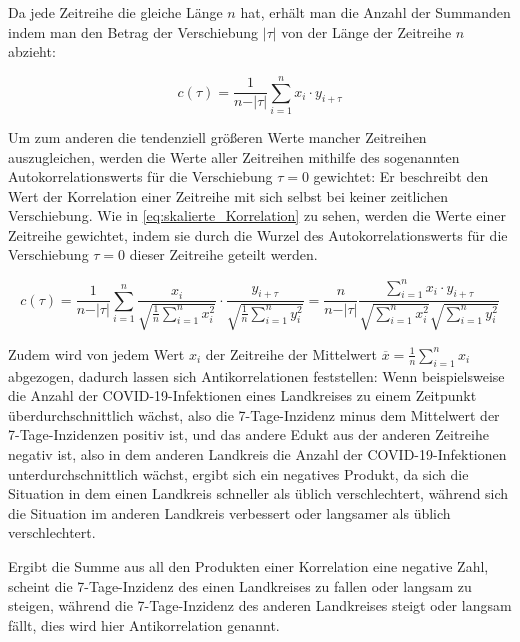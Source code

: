 Da jede Zeitreihe die gleiche Länge $n$ hat, erhält man die Anzahl der Summanden indem man
den Betrag der Verschiebung $\vert\tau\vert$
von der Länge der Zeitreihe $n$ abzieht:

\begin{equation}\label{eq:skalierte_Korrelation_geteilt_durch_Produkte}
    c(\tau) =\frac{1}{n-\vert\tau\vert} \sum_{i=1}^n x_i\cdot y_{i+\tau}
\end{equation}

Um zum anderen die tendenziell größeren Werte mancher Zeitreihen auszugleichen, werden die Werte aller Zeitreihen mithilfe des sogenannten \glqq{}Autokorrelationswerts für die Verschiebung $\tau=0$ \grqq{} gewichtet: Er beschreibt den Wert der Korrelation einer Zeitreihe mit sich selbst bei keiner zeitlichen Verschiebung. Wie in \autoref{eq:skalierte_Korrelation} zu sehen, werden die Werte einer Zeitreihe gewichtet, indem sie durch die Wurzel des Autokorrelationswerts für die Verschiebung $\tau=0$ dieser Zeitreihe geteilt werden.

\begin{equation}\label{eq:skalierte_Korrelation}
    c(\tau) =
    \frac{1}{n-\vert\tau\vert}
    \sum_{i=1}^n
    \frac{x_i}{\sqrt{\frac{1}{n}\sum_{i=1}^n x_i^2}}
    \cdot
    \frac{y_{i+\tau}}{\sqrt{\frac{1}{n}\sum_{i=1}^n y_i^2}}
    =
    \frac{n}{n-\vert\tau\vert}
    \frac{\sum_{i=1}^n x_i \cdot y_{i+\tau}}
    {\sqrt{\sum_{i=1}^n x_i^2}
    \sqrt{\sum_{i=1}^n y_i^2}}
\end{equation}


Zudem wird von jedem Wert $x_i$ der Zeitreihe der Mittelwert $\overline x = \frac{1}{n}\sum_{i=1}^n x_i$ abgezogen, dadurch lassen sich Antikorrelationen feststellen: Wenn beispielsweise die Anzahl der COVID-19-Infektionen eines Landkreises zu einem Zeitpunkt überdurchschnittlich wächst, also die 7-Tage-Inzidenz minus dem Mittelwert der 7-Tage-Inzidenzen positiv ist, und das andere Edukt aus der anderen Zeitreihe negativ ist, also in dem anderen Landkreis die Anzahl der COVID-19-Infektionen unterdurchschnittlich wächst, ergibt sich ein negatives Produkt, da sich die Situation in dem einen Landkreis  schneller als üblich verschlechtert, während sich die Situation im anderen Landkreis verbessert oder langsamer als üblich verschlechtert.

Ergibt die Summe aus all den Produkten einer Korrelation eine negative Zahl, scheint die 7-Tage-Inzidenz des einen Landkreises zu fallen oder langsam zu steigen, während die 7-Tage-Inzidenz des anderen Landkreises steigt oder langsam fällt, dies wird hier Antikorrelation genannt.

